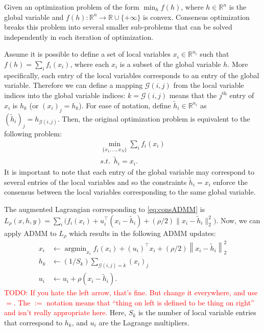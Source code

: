 \documentclass{article}
\DeclareMathOperator*{\argmin}{argmin}
\newcommand{\attn}[1]{\textcolor{red}{TODO: #1}}
\newcommand{\norm}[1]{\left\lVert #1 \right\rVert}
\begin{document}
Given an optimization problem of the form $\min_h f(h)$, where
$h\in\mathbb{R}^n$ is the global variable and
$f(h):\mathbb{R}^n \rightarrow \mathbb{R}\cup \{+\infty\}$ is
convex. Consensus optimization breaks this problem
into several smaller sub-problems that can be solved independently in
each iteration of optimization.  

Assume it is possible to define a set of local variables
$x_i \in \mathbb{R}^{n_i}$ such that $f(h)=\sum_i f_i(x_i)$, where
each $x_i$ is a subset of the global variable $h$. More specifically,
each entry of the local variables corresponds to an entry of the
global variable. Therefore we can define a mapping $\mathscr{G}(i,j)$
from the local variable indices into the global variable indices:
$k=\mathscr{G}(i,j)$ means that the $j^\text{th}$ entry of $x_i$ is
$h_k$ (or $(x_i)_j=h_k$). For ease of notation, define $\tilde{h}_i
\in \mathbb{R}^{n_i}$ as $(\tilde{h}_i)_j=h_{\mathscr{G}(i,j)}$. Then,
the original optimization problem is equivalent to the following
problem:  
\begin{equation}
\begin{aligned}
\min_{\{x_1,...,x_N  \}} \sum_i f_i(x_i)\\
 s.t. \,\,\, \tilde{h}_i=x_i. \,\,\,\,\,\,
\end{aligned}
\label{eq:consADMM}
\end{equation}
It is important to note that each entry of the global variable may
correspond to several entries of the local variables and so the
constraints $\tilde{h}_i=x_i$ enforce the consensus between the local
variables corresponding to the same global variable.  

The augmented Lagrangian corresponding to 
\eqref{eq:consADMM} is $L_\rho(x,h,y)=\sum_i
\big(f_i(x_i)+u_i^\top(x_i-\tilde{h}_i) + (\rho/2) \lVert
x_i-\tilde{h}_i \lVert_2^2 \big)$. Now, we can apply ADMM to $L_\rho$
which results in the following ADMM updates:
\begin{align}
x_i&\leftarrow\argmin_{x_i} f_i(x_i) + (u_i)^\top x_i +
     (\rho/2)  \norm{ x_i-\tilde{h}_i }_2^2\\
h_k&\leftarrow (1/S_k)\sum_{\mathscr{G}(i,j)=k} (x_i)_j \label{eq:ADMM_steps}\\
u_i&\leftarrow u_i + \rho (x_i-\tilde{h}_i).
\end{align}
\attn{If you hate the left arrow, that's fine. But change it
  everywhere, and use $=$. The $:=$ notation means that ``thing on
  left is defined to be thing on right'' and isn't really appropriate here.}
Here, $S_k$ is the number of local variable entries that correspond to
$h_k$, and $u_i$ are the Lagrange multipliers.  
\end{document}
